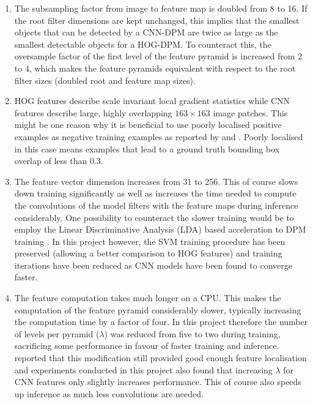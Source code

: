 \begin{enumerate}
\item
The subsampling factor from image to feature map is doubled from 8 to 16. If the root filter dimensions are kept unchanged, this implies that the smallest objects that can be detected by a CNN-DPM are twice as large as the smallest detectable objects for a HOG-DPM. To counteract this, the oversample factor of the first level of the feature pyramid is increased from 2 to 4, which makes the feature pyramids equivalent with respect to the root filter sizes (doubled root and feature map sizes).
\item
HOG features describe scale invariant local gradient statistics while CNN features describe large, highly overlapping  $163\times163$ image patches. This might be one reason why it is beneficial to use poorly localised positive examples as negative training examples as reported by \cite{girshick2014deformable} and \cite{girshick2013rich}. Poorly localised in this case means examples that lead to a ground truth bounding box overlap of less than $0.3$.  
\item
The feature vector dimension increases from 31 to 256. This of course slows down training significantly as well as increases the time needed to compute the convolutions of the model filters with the feature maps during inference considerably. One possibility to counteract the slower training would be to employ the Linear Discriminative Analysis (LDA) based acceleration to DPM training \cite{girshick2013training}. In this project however, the SVM training procedure has been preserved (allowing a better comparison to HOG features) and training iterations have been reduced as CNN models have been found to converge faster. 
\item
The feature computation takes much longer on a CPU. This makes the computation of the feature pyramid  considerably slower, typically increasing the computation time by a factor of four. In this project therefore the number of levels per pyramid ($\lambda$) was reduced from five to two during training, sacrificing some performance in favour of faster training and inference. \cite{girshick2014deformable} reported that this modification still provided good enough feature  localisation and experiments conducted in this project also found that increasing $\lambda$ for CNN features only slightly increases performance. This of course also speeds up inference as much less convolutions are needed.
\end{enumerate}


